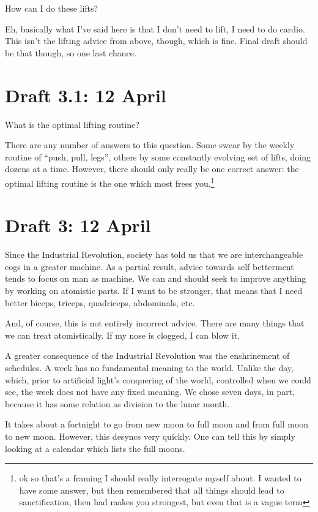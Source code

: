 \documentclass[12pt]{article}
\newcommand{\say}[1]{``#1''}
\renewcommand{\,}{\textsuperscript{,}}
\begin{document}
How can I do these lifts?

Eh, basically what I've said here is that I don't need to lift, I need to do cardio.  
This isn't the lifting advice from above, though, which is fine.  
Final draft should be that though, so one last chance.

\section{Draft 3.1: 12 April}

What is the optimal lifting routine?

There are any number of answers to this question.  
Some swear by the weekly routine of \say{push, pull, legs}, others by some constantly evolving set of lifts, doing dozens at a time.  
However, there should only really be one correct answer: the optimal lifting routine is the one which most frees you.\footnote{ok so that's a framing I should really interrogate myself about. I wanted to have some answer, but then remembered that all things should lead to sanctification, then had makes you strongest, but even that is a vague term}

\section{Draft 3: 12 April}

Since the Industrial Revolution, society has told us that we are interchangeable cogs in a greater machine.  
As a partial result, advice towards self betterment tends to focus on man as machine.  
We can and should seek to improve anything by working on atomistic parts.  
If I want to be stronger, that means that I need better biceps, triceps, quadriceps, abdominals, etc.

And, of course, this is not entirely incorrect advice.  
There are many things that we can treat atomistically.  
If my nose is clogged, I can blow it.

A greater consequence of the Industrial Revolution was the enshrinement of schedules.  
A week has no fundamental meaning to the world.  
Unlike the day, which, prior to artificial light's conquering of the world, controlled when we could see, the week does not have any fixed meaning.  
We chose seven days, in part, because it has some relation as division to the lunar month.

It takes about a fortnight to go from new moon to full moon and from full moon to new moon.  
However, this desyncs very quickly.  
One can tell this by simply looking at a calendar which lists the full moons.
\end{document}
